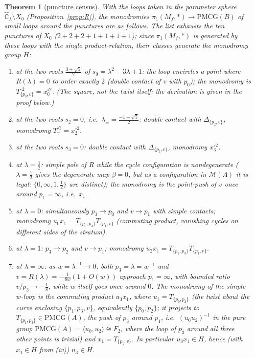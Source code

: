 \documentclass[11pt]{article}
\newtheorem{theorem}{Theorem}[section]
\theoremstyle{definition}
\theoremstyle{remark}
\newcommand{\MM}{\mathcal M}
\newcommand{\PMCG}{\mathrm{PMCG}}
\newcommand{\Chat}{\widehat{\mathbb C}}
\begin{document}
\begin{theorem}[puncture census]\label{thm:monodromy-full}
With the loops taken in the parameter sphere
$\Chat_\lambda\setminus X_0$ \textup{(}Proposition~\ref{prop:R}\textup{)},
the monodromies $\pi_1(M_f,\ast)\to\PMCG(B)$ of small loops around the
punctures are as follows.  The list exhausts the ten punctures of
$X_0$ ($2+2+2+1+1+1+1$); since $\pi_1(M_f,\ast)$ is generated by these
loops with the single product-relation, their classes generate the
monodromy group $H$:
\begin{enumerate}[label=\textup{(}\roman*\textup{)}]
\item at the two roots $\tfrac{3\pm\sqrt5}{2}$ of
$s_0=\lambda^2-3\lambda+1$: the loop encircles a point where
$R(\lambda)=0$ to order exactly $2$ (double contact of $v$ with $p_0$);
the monodromy is $T_{\{p_0,v\}}^{\circ2}=x_0^{\circ2}$.  (The square,
not the twist itself: the derivation is given in the proof below.)
\item at the two roots $s_2=0$, i.e.\ $\lambda_\pm=\tfrac{-1\pm\sqrt5}2$:
double contact with $\Delta_{\{p_2,v\}}$, monodromy
$T_\gamma^{\circ2}=x_2^{\circ2}$.
\item at the two roots $s_3=0$: double contact with
$\Delta_{\{p_3,v\}}$, monodromy $x_3^{\circ2}$.
\item at $\lambda=\tfrac12$: simple pole of $R$ while the cycle
configuration is nondegenerate \textup{(}$\lambda=\tfrac12$ gives the
degenerate map $\beta=0$, but as a configuration in $\MM(A)$ it is
legal: $\{0,\infty,1,\tfrac12\}$ are distinct\textup{)}; the monodromy is
the point-push of $v$ once around $p_1=\infty$, i.e.\ $x_1$.
\item at $\lambda=0$: simultaneously $p_3\to p_0$ and $v\to p_1$ with
simple contacts; monodromy $u_0x_1=T_{\{p_0,p_3\}}T_{\{p_1,v\}}$
\textup{(}commuting product, vanishing cycles on different sides of the
stratum\textup{)}.
\item at $\lambda=1$: $p_3\to p_2$ and $v\to p_1$;
monodromy $u_2x_1=T_{\{p_2,p_3\}}T_{\{p_1,v\}}$.
\item at $\lambda=\infty$: as $w=\lambda^{-1}\to0$, both
$p_3=\lambda=w^{-1}$ and $v=R(\lambda)=-\frac1{8w}(1+O(w))$ approach
$p_1=\infty$, with bounded ratio $v/p_3\to-\tfrac18$, while $w$ itself
goes once around $0$.  The monodromy of the simple $w$-loop is the
commuting product $u_3x_1$, where $u_3=T_{\{p_0,p_2\}}$
\textup{(}the twist about the curve enclosing $\{p_1,p_3,v\}$,
equivalently $\{p_0,p_2\}$; it projects to
$T_{\{p_1,p_3\}}\in\PMCG(A)$, the push of $p_3$ around $p_1$, i.e.\
$(u_0u_2)^{-1}$ in the pure group
$\PMCG(A)=\langle u_0,u_2\rangle\cong F_2$, where the loop of $p_3$
around all three other points is trivial\textup{)} and
$x_1=T_{\{p_1,v\}}$.  In
particular $u_3x_1\in H$, hence (with $x_1\in H$ from (iv))
$u_3\in H$.
\end{enumerate}
\end{theorem}
\end{document}
